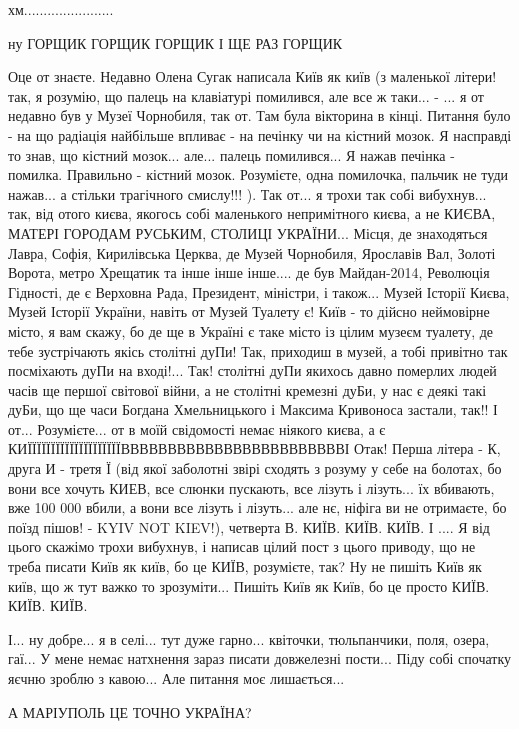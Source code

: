 хм.......................

ну ГОРЩИК ГОРЩИК ГОРЩИК І ЩЕ РАЗ ГОРЩИК

Оце от знаєте. Недавно Олена Сугак написала Київ як київ (з маленької літери!
так, я розумію, що палець на клавіатурі помилився, але все ж таки... - ... я от
недавно був у Музеї Чорнобиля, так от. Там була вікторина в кінці. Питання було
- на що радіація найбільше впливає - на печінку чи на кістний мозок. Я
насправді то знав, що кістний мозок... але... палець помилився... Я нажав
печінка - помилка. Правильно - кістний мозок. Розумієте, одна помилочка,
пальчик не туди нажав... а стільки трагічного смислу!!! ). Так от... я трохи
так собі вибухнув... так, від отого києва, якогось собі маленького непримітного
києва, а не КИЄВА, МАТЕРІ ГОРОДАМ РУСЬКИМ, СТОЛИЦІ УКРАЇНИ... Місця, де
знаходяться Лавра, Софія, Кирилівська Церква, де Музей Чорнобиля, Ярославів
Вал, Золоті Ворота, метро Хрещатик та інше інше інше.... де був Майдан-2014,
Революція Гідності, де є Верховна Рада, Президент, міністри, і також... Музей
Історії Києва, Музей Історії України, навіть от Музей Туалету є! Київ - то
дійсно неймовірне місто, я вам скажу, бо де ще в Україні є таке місто із цілим
музеєм туалету, де тебе зустрічають якісь столітні дуПи! Так, приходиш в музей,
а тобі привітно так посміхають дуПи на вході!... Так! столітні дуПи якихось
давно померлих людей часів ще першої світової війни, а не столітні кремезні
дуБи, у нас є деякі такі дуБи, що ще часи Богдана Хмельницького і Максима
Кривоноса застали, так!! І от... Розумієте... от в моїй свідомості немає
ніякого києва, а є КИЇЇЇЇЇЇЇЇЇЇЇЇЇЇЇЇЇЇЇЇВВВВВВВВВВВВВВВВВВВВВВВВІ Отак! Перша
літера - К, друга И - третя Ї (від якої заболотні звірі сходять з розуму у себе
на болотах, бо вони все хочуть КИЕВ, все слюнки пускають, все лізуть і
лізуть... їх вбивають, вже 100 000 вбили, а вони все лізуть і лізуть... але нє,
ніфіга ви не отримаєте, бо поїзд пішов! - KYIV NOT KIEV!), четверта В. КИЇВ.
КИЇВ. КИЇВ. І .... Я від цього скажімо трохи вибухнув, і написав цілий пост з
цього приводу, що не треба писати Київ як київ, бо це КИЇВ, розумієте, так? Ну
не пишіть Київ як київ, що ж тут важко то зрозуміти... Пишіть Київ як Київ, бо
це просто КИЇВ. КИЇВ. КИЇВ.

І... ну добре... я в селі... тут дуже гарно... квіточки, тюльпанчики, поля,
озера, гаї... У мене немає натхнення зараз писати довжелезні пости... Піду собі
спочатку яєчню зроблю з кавою... Але питання моє лишається...

А МАРІУПОЛЬ ЦЕ ТОЧНО УКРАЇНА?

